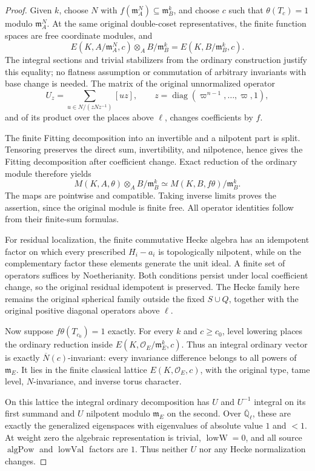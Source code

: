 \begin{proof}
Given \(k\), choose \(N\) with
\(f(\mathfrak m_A^N)\subseteq\mathfrak m_B^k\), and choose \(c\) such
that \(\theta(T_c)=1\) modulo \(\mathfrak m_A^N\).  At the same
original double-coset representatives, the finite function spaces are
free coordinate modules, and
\[
 E(K,A/\mathfrak m_A^N,c)\otimes_A B/\mathfrak m_B^k
       =E(K,B/\mathfrak m_B^k,c).
\]
The integral sections and trivial stabilizers from the ordinary
construction justify this equality; no flatness assumption or
commutation of arbitrary invariants with base change is needed.
The matrix of the original unnormalized operator
\[
 U_z=\sum_{u\in N/(zNz^{-1})}[uz],
 \qquad z=\operatorname{diag}(\varpi^{n-1},\ldots,\varpi,1),
\]
and of its product over the places above \(\ell\), changes coefficients
by \(f\).

The finite Fitting decomposition into an invertible and a nilpotent
part is split.  Tensoring preserves the direct sum, invertibility,
and nilpotence, hence gives the Fitting decomposition after coefficient
change.  Exact reduction of the ordinary module therefore yields
\[
 M(K,A,\theta)\otimes_A B/\mathfrak m_B^k
       \simeq M(K,B,f\theta)/\mathfrak m_B^k.
\]
The maps are pointwise and compatible.  Taking inverse limits proves
the assertion, since the original module is finite free.
All operator identities follow from their finite-sum formulas.

For residual localization, the finite commutative Hecke algebra has
an idempotent factor on which every prescribed \(H_i-a_i\) is
topologically nilpotent, while on the complementary factor these
elements generate the unit ideal.  A finite set of operators suffices
by Noetherianity.  Both conditions persist under local coefficient
change, so the original residual idempotent is preserved.
The Hecke family here remains the original spherical family outside
the fixed \(S\cup Q\), together with the original positive diagonal
operators above \(\ell\).

Now suppose \(f\theta(T_{c_0})=1\) exactly.  For every \(k\) and
\(c\geq c_0\), level lowering places the ordinary reduction inside
\(E(K,\mathcal O_E/\mathfrak m_E^k,c)\).  Thus an integral ordinary
vector is exactly \(\overline N(c)\)-invariant: every invariance
difference belongs to all powers of \(\mathfrak m_E\).  It lies in
the finite classical lattice \(E(K,\mathcal O_E,c)\), with the
original type, tame level, \(N\)-invariance, and inverse torus
character.

On this lattice the integral ordinary decomposition has \(U\) and
\(U^{-1}\) integral on its first summand and \(U\) nilpotent modulo
\(\mathfrak m_E\) on the second.  Over
\(\overline{\mathbb Q}_\ell\), these are exactly the generalized
eigenspaces with eigenvalues of absolute value \(1\) and \(<1\).
At weight zero the algebraic representation is trivial,
\(\operatorname{lowW}=0\), and all source
\(\operatorname{algPow}\) and \(\operatorname{lowVal}\) factors are
\(1\).  Thus neither \(U\) nor any Hecke normalization changes.


\end{proof}

